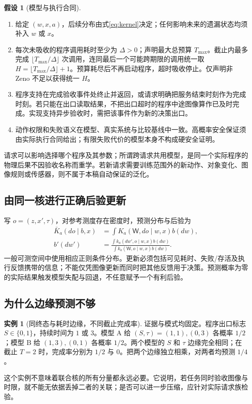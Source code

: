 \documentclass[11pt,a4paper,fontset=fandol]{ctexart}
\theoremstyle{definition}
\newtheorem{assumption}[theorem]{假设}
\newtheorem{example}[theorem]{实例}
\theoremstyle{remark}
\numberwithin{equation}{section}
\begin{document}
\begin{assumption}[模型与执行合同]
\label{ass:model}
\begin{enumerate}
\item 给定 $(w,x,a)$，后续分布由式\eqref{eq:kernel}决定；任何影响未来的遗漏状态均须补入 $w$ 或 $x$。
\item 每次未吸收的程序调用耗时至少为 $\Delta>0$；声明最大总预算 $T_{\max}$。截止内最多完成 $\lfloor T_{\max}/\Delta\rfloor$ 次调用，连同最后一个可能跨期限的调用统一取 $H=\lfloor T_{\max}/\Delta\rfloor+1$。预算耗尽后不再启动程序，超时吸收停止。仅声明非 Zeno 不足以获得统一 $H$。
\item 程序支持在完成验收事件处终止并返回，或请求明确把服务结束时刻作为完成时刻。若只能在出口读取结果，不把出口超时的程序中途图像算作已及时完成。实现支持异步验收时，需把该事件作为新的决策出口。
\item 动作权限和失败语义在模型、真实系统与比较基线中一致。高概率安全保证须由实际执行合同给出；有限失败代价的模型本身不构成硬安全证明。
\end{enumerate}
\end{assumption}

请求可以影响选择哪个程序及其参数；所谓跨请求共用模型，是同一个实际程序的物理后果不因验收名称而重学。若新请求需要训练范围外的新动作、对象变化、图像规则或传感器，则不属于本稿自动保证的泛化。

\subsection{由同一核进行正确后验更新}
写 $o=(z,x',\tau)$，对参考测度存在密度时，预测分布与后验为
\begin{align}
 \bar K_a(do\mid b,x)&=\int K_a(\mathsf W,do\mid w,x)b(dw),\label{eq:predictive}\\
 b'(dw')&=\frac{\int k_a(dw',o\mid w,x)b(dw)}{\int k_a(\mathsf W,o\mid w,x)b(dw)}.
 \label{eq:bayes}
\end{align}
一般可测空间中使用相应正则条件分布。更新必须包括可见耗时、失败/存活及执行反馈携带的信息；不能仅凭图像更新而同时把其他反馈用于决策。预测概率为零的实际结果触发模型失配与回退，不任意赋予一个有利后验。

\subsection{为什么边缘预测不够}
\begin{example}[同终态与耗时边缘，不同截止完成率]
\label{ex:marginal}
证据与模式均固定。程序出口标志 $S\in\{0,1\}$，持续时间为 $1$ 或 $3$。模型 A 给 $(S,\tau)=(1,1),(0,3)$ 各概率 $1/2$；模型 B 给 $(1,3),(0,1)$ 各概率 $1/2$。两个模型的 $S$ 和 $\tau$ 边缘完全相同；在截止 $T=2$ 时，完成率分别为 $1/2$ 与 $0$。把两个边缘独立相乘，对两者均预测 $1/4$。
\end{example}
这个实例不意味着联合核的所有分量都永远必要。它说明，若任务同时验收图像与时限，就不能无依据丢掉二者的关联；是否可以进一步压缩，应针对实际请求族检验。
\end{document}

